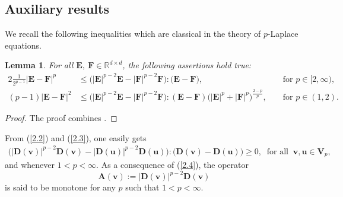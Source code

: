 \documentclass[12pt,reqno]{amsart}
\numberwithin{equation}{section}
\newtheorem{lemma}[theorem]{Lemma}
\theoremstyle{definition}
\def\R{\mathbb{R}}
\def\uu{\boldsymbol{u}}  %
\def\vv{\boldsymbol{v}}
\def\bfF{\mathbf{F}}
\def\bfV{\mathbf{V}}
\def\bfD{\mathbf{D}}
\def\bfE{\mathbf{E}}
\def\bfA{\mathbf{A}}
\def\bfE{\mathbf{E}}
\begin{document}
\subsection{Auxiliary results}
	We recall the following inequalities which are classical in the theory of $p$-Laplace equations.
	\begin{lemma}\label{GM}
		For all $\bfE,\ \bfF\in\R^{d\times d}$, the following assertions hold true:
		\begin{alignat}{2}
			\label{2.2}
			  \frac{1}{2^{p-1}}|\bfE-\bfF|^p&\leq \big(|\bfE|^{p-2}\bfE-|\bfF|^{p-2}\bfF\big):\big(\bfE-\bfF\big), && \text{ for } p\in [2,\infty),\\
			\label{2.3}
			 (p-1)|\bfE-\bfF|^2&\leq \big(|\bfE|^{p-2}\bfE-|\bfF|^{p-2}\bfF\big):(\bfE-\bfF)\big(|\bfE|^p+|\bfF|^p\big)^{\frac{2-p}{p}},&& \text{ for } p\in(1,2).
 		\end{alignat}
	\end{lemma}
	\begin{proof}
The proof combines \cite[Lemmas 5.1 and 5.2]{GM:1975}.
	\end{proof}
	
	From (\ref{2.2}) and (\ref{2.3}), one easily gets
	\begin{align}\label{2.4}
		\big(|\bfD(\vv)|^{p-2}\bfD(\vv)-|\bfD(\uu)|^{p-2}\bfD(\uu)\big):\big(\bfD(\vv)-\bfD(\uu)\big)\geq 0,\  \text{ for all }\  \vv,\uu\in \bfV_p,
	\end{align}
	and whenever $1<p<\infty$.
	As a consequence of (\ref{2.4}), the operator
\begin{equation}\label{op:A(u)}
\bfA(\vv):=|\bfD(\vv)|^{p-2}\bfD(\vv)
\end{equation}
is said to be {monotone} for any $p$ such that $1<p<\infty$.
\end{document}
